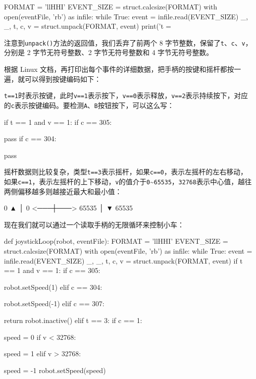 \begin{pythoncode}
FORMAT = 'llHHI'
EVENT_SIZE = struct.calcsize(FORMAT)
with open(eventFile, 'rb') as infile:
    while True:
        event = infile.read(EVENT_SIZE)
        _, _, t, c, v = struct.unpack(FORMAT, event)
        print('t = %
\end{pythoncode}

注意到\texttt{unpack()}方法的返回值，我们丢弃了前两个 8
字节整数，保留了\texttt{t}、\texttt{c}、\texttt{v}，分别是 2
字节无符号整数、2 字节无符号整数和 4 字节无符号整数。

根据 Linux
文档，再打印出每个事件的详细数据，把手柄的按键和摇杆都按一遍，就可以得到按键编码如下：

\texttt{t==1}时表示按键，此时\texttt{v==1}表示按下，\texttt{v==0}表示释放，\texttt{v==2}表示持续按下，对应的\texttt{c}表示按键编码。要检测\texttt{A}、\texttt{B}按钮按下，可以这么写：

\begin{pythoncode}
if t == 1 and v == 1:
    if c == 305:
        
        pass
    if c == 304:
        
        pass
\end{pythoncode}

摇杆数据则比较复杂，类型\texttt{t==3}表示摇杆，如果\texttt{c==0}，表示左摇杆的左右移动，如果\texttt{c==1}，表示左摇杆的上下移动，\texttt{v}的值介于\texttt{0}\textasciitilde{}\texttt{65535}，\texttt{32768}表示中心值，越往两侧偏移越多则越接近最大和最小值：

\begin{pythoncode}
      0
      ▲
      │
0 <───┼───> 65535
      │
      ▼
    65535
\end{pythoncode}

现在我们就可以通过一个读取手柄的无限循环来控制小车：

\begin{pythoncode}
def joystickLoop(robot, eventFile):
    FORMAT = 'llHHI'
    EVENT_SIZE = struct.calcsize(FORMAT)
    with open(eventFile, 'rb') as infile:
        while True:
            event = infile.read(EVENT_SIZE)
            _, _, t, c, v = struct.unpack(FORMAT, event)
            if t == 1 and v == 1:
                if c == 305:
                    
                    robot.setSpeed(1)
                elif c == 304:
                    
                    robot.setSpeed(-1)
                elif c == 307:
                    
                    return robot.inactive()
            elif t == 3:
                if c == 1:
                    
                    speed = 0
                    if v < 32768:
                        
                        speed = 1
                    elif v > 32768:
                        
                        speed = -1
                    robot.setSpeed(speed)
\end{pythoncode}


